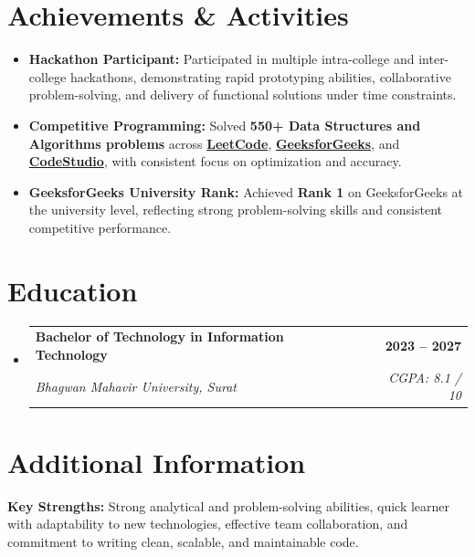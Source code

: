 \documentclass[letterpaper,11pt]{article}
\makeatletter
\newcommand{\resumeItem}[1]{\item\small{{#1 \vspace{-2pt}}}}
\newcommand{\resumeSubheading}[4]{
  \vspace{-2pt}\item
    \begin{tabular*}{1.0\textwidth}[t]{l@{\extracolsep{\fill}}r}
      \textbf{#1} & \textbf{\small #2} \\
      \textit{\small#3} & \textit{\small #4} \\
    \end{tabular*}\vspace{-6pt}
}
\newcommand{\resumeItemListStart}{\begin{itemize}}
\newcommand{\resumeItemListEnd}{\end{itemize}\vspace{-5pt}}
\newcommand{\resumeSubHeadingListStart}{\begin{itemize}[leftmargin=0.0in, label={}]}
\newcommand{\resumeSubHeadingListEnd}{\end{itemize}}
\makeatother
\begin{document}
\section{Achievements \& Activities}
\resumeItemListStart
  \resumeItem{\textbf{Hackathon Participant:} Participated in multiple intra-college and inter-college hackathons, demonstrating rapid prototyping abilities, collaborative problem-solving, and delivery of functional solutions under time constraints.}
\resumeItem{\textbf{Competitive Programming:} Solved \textbf{550+ Data Structures and Algorithms problems} across \textbf{\href{https://leetcode.com/u/deeplukhi11/}{LeetCode}}, \textbf{\href{https://www.geeksforgeeks.org/profile/deeplux1js}{GeeksforGeeks}}, and \textbf{\href{https://www.naukri.com/code360/profile/deeplukhi}{CodeStudio}}, with consistent focus on optimization and accuracy.}
  \resumeItem{\textbf{GeeksforGeeks University Rank:} Achieved \textbf{Rank 1} on GeeksforGeeks at the university level, reflecting strong problem-solving skills and consistent competitive performance.}
\resumeItemListEnd

\section{Education}
\resumeSubHeadingListStart
  \resumeSubheading
    {Bachelor of Technology in Information Technology}{2023 -- 2027}
    {Bhagwan Mahavir University, Surat}{CGPA: 8.1 / 10}
\resumeSubHeadingListEnd

\section{Additional Information}
\textbf{Key Strengths:} Strong analytical and problem-solving abilities, quick learner with adaptability to new technologies, effective team collaboration, and commitment to writing clean, scalable, and maintainable code. \\
\end{document}
